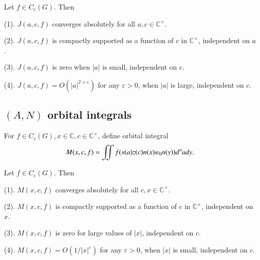 \documentclass{amsproc}
\newcommand{\BC}{{\mathbb {C}}} \newcommand{\BD}{{\mathbb {D}}}
\def\BCx{\BC^{\times}}
\def\dx{d^{\times} \hskip -1 pt}
\theoremstyle{plain}
\numberwithin{equation}{section}
\begin{document}
	
\begin{prop}\label{prop:A1}
Let $f\in C_c (G)$. Then

{\rm(1).} $J(a,c,f)$ converges absolutely for all $a,c\in \BCx$.

{\rm(2).} $J(a,c,f)$ is compactly supported as a function of $c$ in $\BCx$, independent on $a$.

{\rm(3).} $J(a,c,f)$ is zero when $|a|$ is small, independent on $c$.

{\rm(4).} $ J(a,c,f) =O(|a|^{2+\varepsilon})$ for any $\varepsilon>0$, when $|a|$ is large, independent on $c$.
\end{prop}

\subsection{$(A,N)$ orbital integrals}
 For $f\in C_c (G), x\in \BC, c\in \BCx$, define orbital integral
\begin{equation}\label{def: M(x,c,f)}
 M(x,c,f)=\iint f(s(a)z(c)n(x)\varw_0n(y))\dx  a dy.
\end{equation}

\begin{prop}\label{propA2}
Let $f\in C_c (G)$. Then

{\rm(1).} $M(x,c,f)$ converges absolutely for all $c, x \in \BCx$.

{\rm(2).} $M(x,c,f) $ is compactly supported as a function of $c$ in $\BCx$, independent on $x$.

{\rm(3).} $M(x,c,f) $ is zero for large values of $|x|$, independent on $c$.

{\rm(4).} $M(x,c,f) =O(1/|x|^{\varepsilon})$ for any $\varepsilon>0$, when $|x|$ is small, independent on $c$. %
\end{prop}
	
\end{document}
